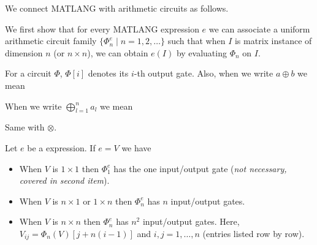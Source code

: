 We connect MATLANG with arithmetic circuits as follows.

We first show that for every MATLANG expression $e$ we can associate a uniform arithmetic circuit family $\{\Phi_n^e\mid n=1,2,\ldots\}$ such that when $I$ is matrix instance of dimension $n$ (or $n\times n$), we can obtain $e(I)$ by evaluating $\Phi_n$ on $I$. 

For a circuit $\Phi$, $\Phi[i]$ denotes its $i$-th output gate. Also, when we write $a \oplus b$ we mean 

\begin{center}
\end{center}

When we write $\bigoplus_{l=1}^n a_l$ we mean 

\begin{center}
\end{center}

Same with $\otimes$.

Let $e$ be a \langfor expression. If $e=V$ we have
\begin{itemize}
	\item When $V$ is $1\times 1$ then $\Phi^e_1$ has the one input/output gate (\textit{not necessary, covered in second item}).
	\item When $V$ is $n\times 1$ or $1\times n$ then $\Phi^e_n$ has $n$ input/output gates.
	\item When $V$ is $n\times n$ then $\Phi^e_n$ has $n^2$ input/output gates. Here, $V_{ij}=\Phi_n(V)\left[ j+n(i-1)\right]$ and $i,j=1,\ldots, n$ (entries listed row by row).
\end{itemize}


